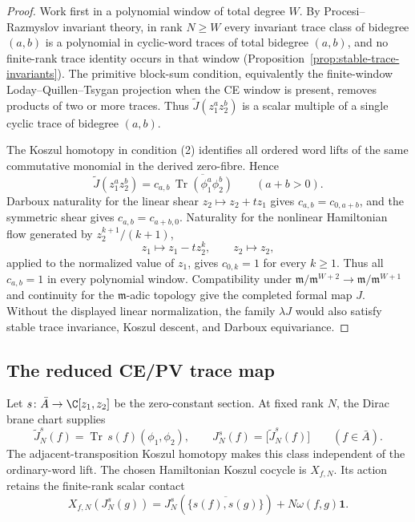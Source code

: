 \documentclass[11pt]{memoir}
\begin{document}
\begin{proof}
  Work first in a polynomial window of total degree \(W\).  By
  Procesi--Razmyslov invariant theory, in rank \(N\geq W\) every
  invariant trace class of bidegree \((a,b)\) is a polynomial in
  cyclic-word traces of total bidegree \((a,b)\), and no finite-rank
  trace identity occurs in that window
  (Proposition~\ref{prop:stable-trace-invariants}).  The primitive
  block-sum condition, equivalently the finite-window
  Loday--Quillen--Tsygan projection when the CE window is present,
  removes products of two or more traces.  Thus
  \(\widetilde J(z_1^az_2^b)\) is a scalar multiple of a single cyclic
  trace of bidegree \((a,b)\).

  The Koszul homotopy in condition \textup{(2)} identifies all ordered
  word lifts of the same commutative monomial in the derived
  zero-fibre.  Hence
  \[
    \widetilde J(z_1^az_2^b)
    =
    c_{a,b}\,
    \overline{\operatorname{Tr}(\phi_1^a\phi_2^b)}
    \qquad(a+b>0).
  \]
  Darboux naturality for the linear shear
  \(z_2\mapsto z_2+tz_1\) gives
  \(c_{a,b}=c_{0,a+b}\), and the symmetric shear gives
  \(c_{a,b}=c_{a+b,0}\).  Naturality for the nonlinear Hamiltonian flow
  generated by \(z_2^{k+1}/(k+1)\),
  \[
    z_1\mapsto z_1-tz_2^k,\qquad z_2\mapsto z_2,
  \]
  applied to the normalized value of \(z_1\), gives
  \(c_{0,k}=1\) for every \(k\geq1\).  Thus all \(c_{a,b}=1\) in every
  polynomial window.  Compatibility under
  \(\mathfrak m/\mathfrak m^{W+2}\to\mathfrak m/\mathfrak m^{W+1}\)
  and continuity for the \(\mathfrak m\)-adic topology give the
  completed formal map \(J\).  Without the displayed linear
  normalization, the family \(\lambda J\) would also satisfy stable
  trace invariance, Koszul descent, and Darboux equivariance.
\end{proof}

\subsection{The reduced CE/PV trace map}\label{ssec:reduced-ce-pv-trace-map}

Let \(s\colon\bar A\to\C[z_1,z_2]\) be the zero-constant section.  At
fixed rank \(N\), the Dirac brane chart supplies
\[
  \widetilde J_N^s(f)
    =\operatorname{Tr}\,s(f)(\phi_1,\phi_2),
  \qquad
  J_N^s(f)=\bigl[\widetilde J_N^s(f)\bigr]
  \qquad(f\in\bar A).
\]
The adjacent-transposition Koszul homotopy makes this class independent
of the ordinary-word lift.  The chosen Hamiltonian Koszul cocycle is
\(X_{f,N}\).  Its action retains the finite-rank scalar contact
\[
  X_{f,N}(J_N^s(g))
  =J_N^s\!\left(\overline{\{s(f),s(g)\}}\right)
    +N\omega(f,g)\mathbf1.
\]
\end{document}
